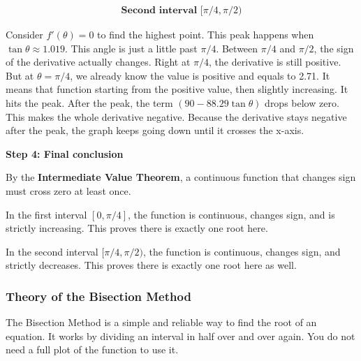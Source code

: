 \documentclass{article}
\begin{document}
\begin{align*}
    \textbf{Second interval $[\pi/4, \pi/2)$}
\end{align*}

Consider $f'(\theta) = 0$ to find the highest point.
This peak happens when $\tan\theta\approx 1.019$. This angle is just a little past $\pi/4$. Between $\pi/4$ and $\pi/2$, the sign of the derivative actually changes. Right at $\pi/4$, the derivative is still positive. But at $\theta = \pi/4$, we already know the value is positive and equals to 2.71. It means that function starting from the positive value, then slightly increasing. It hits the peak. After the peak, the term $(90 - 88.29 \tan\theta)$ drops below zero. This makes the whole derivative negative. Because the derivative stays negative after the peak, the graph keeps going down until it crosses the x-axis.


\vspace{5pt}
\noindent \textbf{Step 4: Final conclusion}

By the \textbf{Intermediate Value Theorem}, a continuous function that changes sign must cross zero at least once.

In the first interval $[0, \pi/4]$, the function is continuous, changes sign, and is strictly increasing. This proves there is exactly one root here.

In the second interval $[\pi/4, \pi/2)$, the function is continuous, changes sign, and strictly decreases. This proves there is exactly one root here as well.


\subsubsection{Theory of the Bisection Method} 

The Bisection Method \cite[page 25]{Sauer2014} is a simple and reliable way to find the root of an equation. It works by dividing an interval in half over and over again. You do not need a full plot of the function to use it.
\end{document}

